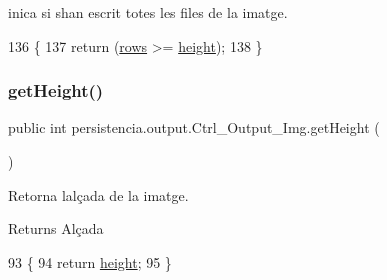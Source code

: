 inica si s\textquotesingle{}han escrit totes les files de la imatge. 


\begin{DoxyCode}
136                               \{
137         \textcolor{keywordflow}{return} (\hyperlink{classpersistencia_1_1output_1_1Ctrl__Output__Img_a586ee8128a26b6786471e040a705bdbc}{rows} >= \hyperlink{classpersistencia_1_1output_1_1Ctrl__Output__Img_a1d7bc52c64c79e8545ae6d1ae8b9ee2e}{height});
138     \}
\end{DoxyCode}
\mbox{\label{classpersistencia_1_1output_1_1Ctrl__Output__Img_a736bcf38410d875d9b4a17fd2a95cc4d}} 
\subsubsection{\texorpdfstring{get\+Height()}{getHeight()}}
{\footnotesize\ttfamily public int persistencia.\+output.\+Ctrl\+\_\+\+Output\+\_\+\+Img.\+get\+Height (\begin{DoxyParamCaption}{ }\end{DoxyParamCaption})\hspace{0.3cm}{\ttfamily [inline]}}



Retorna l\textquotesingle{}alçada de la imatge. 

\begin{DoxyReturn}{Returns}
Alçada 
\end{DoxyReturn}

\begin{DoxyCode}
93                            \{
94         \textcolor{keywordflow}{return} \hyperlink{classpersistencia_1_1output_1_1Ctrl__Output__Img_a1d7bc52c64c79e8545ae6d1ae8b9ee2e}{height};
95     \}
\end{DoxyCode}
\mbox{\label{classpersistencia_1_1output_1_1Ctrl__Output__Img_ab6e88e466e6b7d7d847be2ac9c26c529}} 
